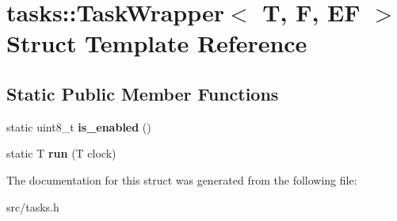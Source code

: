 \hypertarget{structtasks_1_1TaskWrapper}{}\section{tasks\+:\+:Task\+Wrapper$<$ T, F, EF $>$ Struct Template Reference}
\label{structtasks_1_1TaskWrapper}
\subsection*{Static Public Member Functions}
\begin{DoxyCompactItemize}
\item 
\hypertarget{structtasks_1_1TaskWrapper_a3346409533115d46abbfe8bcb3143111}{}\label{structtasks_1_1TaskWrapper_a3346409533115d46abbfe8bcb3143111} 
static uint8\+\_\+t {\bfseries is\+\_\+enabled} ()
\item 
\hypertarget{structtasks_1_1TaskWrapper_aebf6ca353163af6f0386ba63c6a67307}{}\label{structtasks_1_1TaskWrapper_aebf6ca353163af6f0386ba63c6a67307} 
static T {\bfseries run} (T clock)
\end{DoxyCompactItemize}


The documentation for this struct was generated from the following file\+:\begin{DoxyCompactItemize}
\item 
src/tasks.\+h\end{DoxyCompactItemize}
